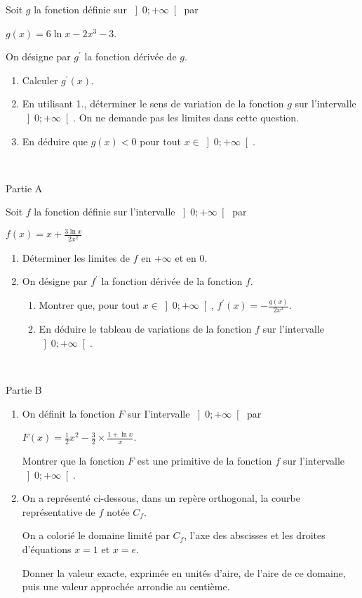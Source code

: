 Soit $g$ la fonction définie sur $\left]0; +\infty \right[$ par
\par
$g\left(x\right)=6\ln x-2x^{3}-3$.
\par
On désigne par $g^{\prime}$ la fonction dérivée de $g$.
\begin{enumerate}
     \item
     Calculer $g^{\prime}\left(x\right)$.
     \item
     En utilisant 1., déterminer le sens de variation de la fonction $g$ sur l'intervalle $\left]0; +\infty \right[$. On ne demande pas les limites dans cette question.
     \item
     En déduire que $g\left(x\right) < 0$ pour tout $x\in \left]0; +\infty \right[$.
\end{enumerate}
 
\begin{h3}Partie A\end{h3}
Soit $f$ la fonction définie sur l'intervalle $\left]0; +\infty \right[$ par
\par
$f\left(x\right)=x+\frac{3\ln x}{2x^{2}}$
\begin{enumerate}
     \item
     Déterminer les limites de $f$ en $+\infty $ et en $0$.
     \item
     On désigne par $f^{\prime}$ la fonction dérivée de la fonction $f$.
     \begin{enumerate} [label=\alph*.]
          \item
          Montrer que, pour tout $x\in \left]0; +\infty \right[$, $f^{\prime}\left(x\right)=- \frac{g\left(x\right)}{2x^{3}}$.
          \item
          En déduire le tableau de variations de la fonction $f$ sur l'intervalle $\left]0; +\infty \right[$.
     \end{enumerate}
\end{enumerate}
 
\begin{h3}Partie B\end{h3}
\begin{enumerate}
     \item
     On définit la fonction $F$ sur I'intervalle $\left]0; +\infty \right[$ par
     \par
     $F\left(x\right)=\frac{1}{2}x^{2}-\frac{3}{2} \times   \frac{1+\ln x}{x}$.
     \par
     Montrer que la fonction $F$ est une primitive de la fonction $f$ sur l'intervalle $\left]0; +\infty \right[$.
     \item
     On a représenté ci-dessous, dans un repère orthogonal, la courbe représentative de $f$ notée $C_{f}$.
     \par
     On a colorié le domaine limité par $C_{f}$, l'axe des abscisses et les droites d'équations $x=1$ et $x= e$.
     \par
     Donner la valeur exacte, exprimée en unités d'aire, de l'aire de ce domaine, puis une valeur approchée arrondie au centième.

\begin{center}
\end{center}
\end{enumerate}


